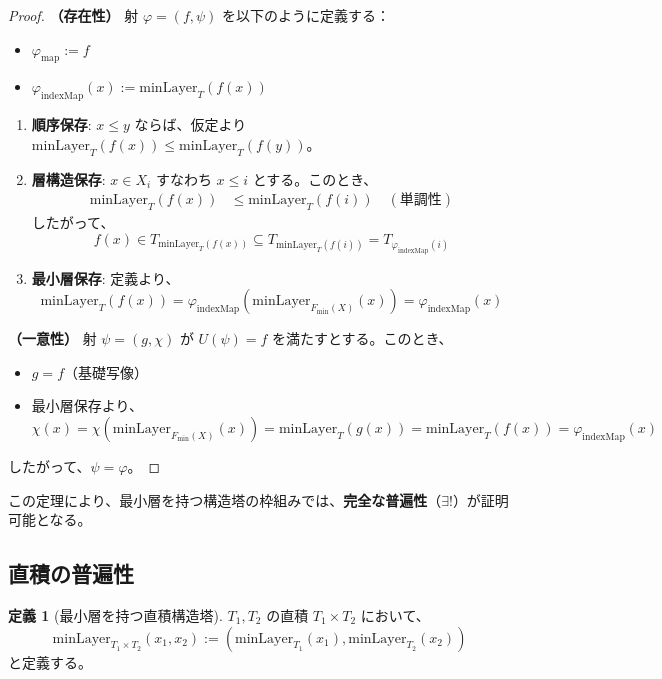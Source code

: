 \documentclass[a4paper,12pt]{ltjsarticle}
\theoremstyle{definition}
\newtheorem{definition}{定義}[section]
\begin{document}
\begin{proof}
\textbf{（存在性）}
射 $\varphi = (f, \psi)$ を以下のように定義する：
\begin{itemize}
\item $\varphi_{\text{map}} := f$
\item $\varphi_{\text{indexMap}}(x) := \mathrm{minLayer}_T(f(x))$
\end{itemize}

\begin{enumerate}
\item \textbf{順序保存}: $x \leq y$ ならば、仮定より $\mathrm{minLayer}_T(f(x)) \leq \mathrm{minLayer}_T(f(y))$。
\item \textbf{層構造保存}: $x \in X_i$ すなわち $x \leq i$ とする。このとき、
\begin{align*}
\mathrm{minLayer}_T(f(x)) &\leq \mathrm{minLayer}_T(f(i)) \quad (\text{単調性})
\end{align*}
したがって、
\[
f(x) \in T_{\mathrm{minLayer}_T(f(x))} \subseteq T_{\mathrm{minLayer}_T(f(i))} = T_{\varphi_{\text{indexMap}}(i)}
\]
\item \textbf{最小層保存}: 定義より、
\[
\mathrm{minLayer}_T(f(x)) = \varphi_{\text{indexMap}}(\mathrm{minLayer}_{F_{\min}(X)}(x)) = \varphi_{\text{indexMap}}(x)
\]
\end{enumerate}

\textbf{（一意性）}
射 $\psi = (g, \chi)$ が $U(\psi) = f$ を満たすとする。このとき、
\begin{itemize}
\item $g = f$（基礎写像）
\item 最小層保存より、
\[
\chi(x) = \chi(\mathrm{minLayer}_{F_{\min}(X)}(x)) = \mathrm{minLayer}_T(g(x)) = \mathrm{minLayer}_T(f(x)) = \varphi_{\text{indexMap}}(x)
\]
\end{itemize}
したがって、$\psi = \varphi$。
\end{proof}

この定理により、最小層を持つ構造塔の枠組みでは、\textbf{完全な普遍性}（$\exists!$）が証明可能となる。

\subsection{直積の普遍性}

\begin{definition}[最小層を持つ直積構造塔]
$T_1, T_2$ の直積 $T_1 \times T_2$ において、
\[
\mathrm{minLayer}_{T_1 \times T_2}(x_1, x_2) := (\mathrm{minLayer}_{T_1}(x_1), \mathrm{minLayer}_{T_2}(x_2))
\]
と定義する。
\end{definition}
\end{document}
